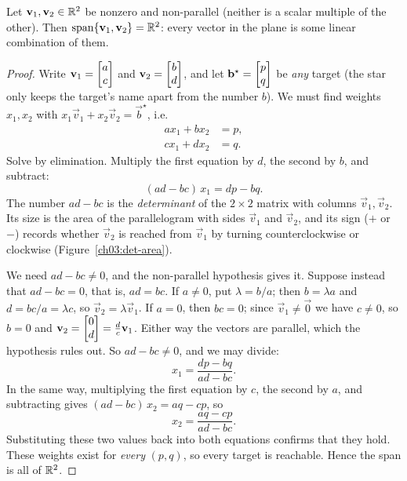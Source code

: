 \begin{theorem}\label{ch03:thm-span-r2}
Let $\mathbf{v}_1,\mathbf{v}_2 \in \mathbb{R}^2$ be nonzero and non-parallel (neither is a scalar multiple of the other). Then $\operatorname{span}\{\mathbf{v}_1,\mathbf{v}_2\} = \mathbb{R}^2$: every vector in the plane is some linear combination of them.
\end{theorem}

\begin{proof}
Write $\mathbf{v}_1 = \begin{bmatrix}a\\c\end{bmatrix}$ and $\mathbf{v}_2 = \begin{bmatrix}b\\d\end{bmatrix}$, and let $\mathbf{b}^\star = \begin{bmatrix}p\\q\end{bmatrix}$ be \emph{any} target (the star only keeps the target's name apart from the number $b$). We must find weights $x_1,x_2$ with $x_1\vec{v}_1 + x_2\vec{v}_2 = \vec{b}^\star$, i.e.
\[
  \begin{aligned}
    a x_1 + b x_2 &= p,\\
    c x_1 + d x_2 &= q.
  \end{aligned}
\]
Solve by elimination. Multiply the first equation by $d$, the second by $b$, and subtract:
\[
  (ad - bc)\,x_1 = dp - bq.
\]
The number $ad-bc$ is the \emph{determinant} of the $2\times 2$ matrix with columns $\vec{v}_1,\vec{v}_2$. Its size is the area of the parallelogram with sides $\vec{v}_1$ and $\vec{v}_2$, and its sign ($+$ or $-$) records whether $\vec{v}_2$ is reached from $\vec{v}_1$ by turning counterclockwise or clockwise (Figure~\ref{ch03:det-area}).

We need $ad-bc\neq 0$, and the non-parallel hypothesis gives it. Suppose instead that $ad-bc=0$, that is, $ad=bc$. If $a\neq 0$, put $\lambda=b/a$; then $b=\lambda a$ and $d=bc/a=\lambda c$, so $\vec{v}_2=\lambda\vec{v}_1$. If $a=0$, then $bc=0$; since $\vec{v}_1\neq\vec{0}$ we have $c\neq 0$, so $b=0$ and $\mathbf{v}_2=\begin{bmatrix}0\\d\end{bmatrix}=\tfrac{d}{c}\mathbf{v}_1$. Either way the vectors are parallel, which the hypothesis rules out. So $ad-bc\neq 0$, and we may divide:
\[
  x_1 = \frac{dp - bq}{ad-bc}.
\]
In the same way, multiplying the first equation by $c$, the second by $a$, and subtracting gives $(ad-bc)\,x_2 = aq-cp$, so
\[
  x_2 = \frac{aq - cp}{ad-bc}.
\]
Substituting these two values back into both equations confirms that they hold. These weights exist for \emph{every} $(p,q)$, so every target is reachable. Hence the span is all of $\mathbb{R}^2$.
\end{proof}

